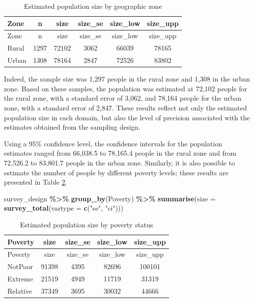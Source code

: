 \documentclass[
  english,
  12pt,
]{book}
\newenvironment{Shaded}{\begin{snugshade}}{\end{snugshade}}
\newcommand{\AttributeTok}[1]{\textcolor[rgb]{0.13,0.29,0.53}{#1}}
\newcommand{\FunctionTok}[1]{\textcolor[rgb]{0.13,0.29,0.53}{\textbf{#1}}}
\newcommand{\NormalTok}[1]{#1}
\newcommand{\SpecialCharTok}[1]{\textcolor[rgb]{0.81,0.36,0.00}{\textbf{#1}}}
\newcommand{\StringTok}[1]{\textcolor[rgb]{0.31,0.60,0.02}{#1}}
\begin{document}
\begin{longtable}[]{@{}lccccc@{}}
\caption{\label{tab:tab-tamano-zona}Estimated population size by geographic zone}\tabularnewline
\toprule\noalign{}
Zone & n & size & size\_se & size\_low & size\_upp \\
\midrule\noalign{}
\endfirsthead
\toprule\noalign{}
Zone & n & size & size\_se & size\_low & size\_upp \\
\midrule\noalign{}
\endhead
\bottomrule\noalign{}
\endlastfoot
Rural & 1297 & 72102 & 3062 & 66039 & 78165 \\
Urban & 1308 & 78164 & 2847 & 72526 & 83802 \\
\end{longtable}

Indeed, the sample size was 1,297 people in the rural zone and 1,308 in the urban zone. Based on these samples, the population was estimated at 72,102 people for the rural zone, with a standard error of 3,062, and 78,164 people for the urban zone, with a standard error of 2,847. These results reflect not only the estimated population size in each domain, but also the level of precision associated with the estimates obtained from the sampling design.

Using a 95\% confidence level, the confidence intervals for the population estimates ranged from 66,038.5 to 78,165.4 people in the rural zone and from 72,526.2 to 83,801.7 people in the urban zone. Similarly, it is also possible to estimate the number of people by different poverty levels; these results are presented in Table \ref{tab:tab-tamano-pobreza}.

\begin{Shaded}
\begin{Highlighting}[]
\NormalTok{survey\_design }\SpecialCharTok{\%\textgreater{}\%}
  \FunctionTok{group\_by}\NormalTok{(Poverty) }\SpecialCharTok{\%\textgreater{}\%}
  \FunctionTok{summarise}\NormalTok{(}\AttributeTok{size =} \FunctionTok{survey\_total}\NormalTok{(}\AttributeTok{vartype =} \FunctionTok{c}\NormalTok{(}\StringTok{"se"}\NormalTok{, }\StringTok{"ci"}\NormalTok{)))}
\end{Highlighting}
\end{Shaded}

\begin{longtable}[]{@{}lcccc@{}}
\caption{\label{tab:tab-tamano-pobreza}Estimated population size by poverty status}\tabularnewline
\toprule\noalign{}
Poverty & size & size\_se & size\_low & size\_upp \\
\midrule\noalign{}
\endfirsthead
\toprule\noalign{}
Poverty & size & size\_se & size\_low & size\_upp \\
\midrule\noalign{}
\endhead
\bottomrule\noalign{}
\endlastfoot
NotPoor & 91398 & 4395 & 82696 & 100101 \\
Extreme & 21519 & 4949 & 11719 & 31319 \\
Relative & 37349 & 3695 & 30032 & 44666 \\
\end{longtable}
\end{document}
